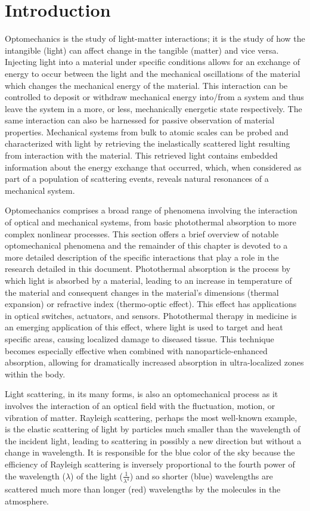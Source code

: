 \chapter{Introduction}
\label{ch:Introduction}
\acresetall

Optomechanics is the study of light-matter interactions; it is the study of how the intangible (light) can affect change in the tangible (matter) and vice versa. Injecting light into a material under specific conditions allows for an exchange of energy to occur between the light and the mechanical oscillations of the material which changes the mechanical energy of the material. This interaction can be controlled to deposit or withdraw mechanical energy into/from a system and thus leave the system in a more, or less, mechanically energetic state respectively. The same interaction can also be harnessed for passive observation of material properties. Mechanical systems from bulk to atomic scales can be probed and characterized with light by retrieving the inelastically scattered light resulting from interaction with the material. This retrieved light contains embedded information about the energy exchange that occurred, which, when considered as part of a population of scattering events, reveals natural resonances of a mechanical system.

Optomechanics comprises a broad range of phenomena involving the interaction of optical and mechanical systems, from basic photothermal absorption to more complex nonlinear processes. This section offers a brief overview of notable optomechanical phenomena and the remainder of this chapter is devoted to a more detailed description of the specific interactions that play a role in the research detailed in this document. Photothermal absorption is the process by which light is absorbed by a material, leading to an increase in temperature of the material and consequent changes in the material's dimensions (thermal expansion) or refractive index (thermo-optic effect). This effect has applications in optical switches\cite{}, actuators\cite{}, and sensors\cite{}. Photothermal therapy in medicine is an emerging application of this effect, where light is used to target and heat specific areas, causing localized damage to diseased tissue\cite{}. This technique becomes especially effective when combined with nanoparticle-enhanced absorption, allowing for dramatically increased absorption in ultra-localized zones within the body.

Light scattering, in its many forms, is also an optomechanical process as it involves the interaction of an optical field with the fluctuation, motion, or vibration of matter. Rayleigh scattering, perhaps the most well-known example, is the elastic scattering of light by particles much smaller than the wavelength of the incident light, leading to scattering in possibly a new direction but without a change in wavelength. It is responsible for the blue color of the sky because the efficiency of Rayleigh scattering is inversely proportional to the fourth power of the wavelength ($\lambda$) of the light ($\frac{1}{\lambda^{4}}$) and so shorter (blue) wavelengths are scattered much more than longer (red) wavelengths by the molecules in the atmosphere.\cite{rayleigh1871light}

